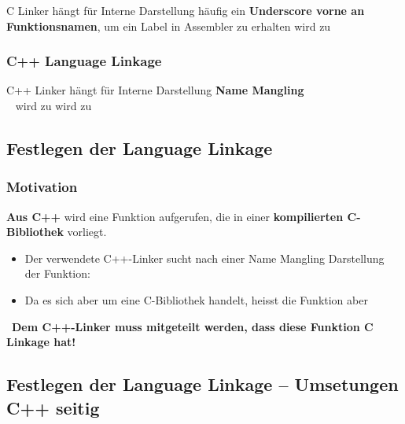 \begin{outline}
    \1 C Linker hängt für Interne Darstellung häufig ein \textbf{Underscore vorne an Funktionsnamen}, um ein Label in Assembler zu erhalten
        \2  wird zu 
\end{outline}


\subsubsection{C++ Language Linkage}

\begin{outline}
    \1 C++ Linker hängt für Interne Darstellung \textbf{Name Mangling} \\
        \textrightarrow\ 
        \2  wird zu 
        \2  wird zu 
\end{outline}


\subsection{Festlegen der Language Linkage}

\subsubsection{Motivation}

\textbf{Aus C++} wird eine Funktion  aufgerufen, die in einer \textbf{kompilierten C-Bibliothek} vorliegt.

\vspace{0.1cm}

\begin{itemize}
    \item Der verwendete C++-Linker sucht nach einer Name Mangling Darstellung der Funktion: 
    \item Da es sich aber um eine C-Bibliothek handelt, heisst die Funktion aber 
\end{itemize}

\vspace{0.1cm}

\textrightarrow\ \textbf{Dem C++-Linker muss mitgeteilt werden, dass diese Funktion C Linkage hat!}


\subsection{Festlegen der Language Linkage -- Umsetungen C++ seitig}

